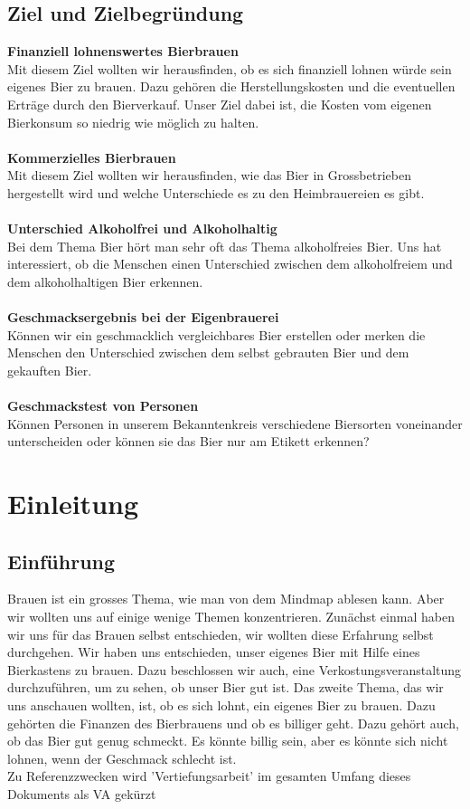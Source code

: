 \subsection{Ziel und Zielbegründung}
\textbf{Finanziell lohnenswertes Bierbrauen}\\
Mit diesem Ziel wollten wir herausfinden, ob es sich finanziell lohnen würde sein eigenes Bier zu brauen. Dazu gehören die Herstellungskosten und die eventuellen Erträge durch den Bierverkauf. Unser Ziel dabei ist, die Kosten vom eigenen Bierkonsum so niedrig wie möglich zu halten.
\\\\\textbf{Kommerzielles Bierbrauen}\\
Mit diesem Ziel wollten wir herausfinden, wie das Bier in Grossbetrieben hergestellt wird und welche Unterschiede es zu den Heimbrauereien es gibt.
\\\\\textbf{Unterschied Alkoholfrei und Alkoholhaltig}\\
Bei dem Thema Bier hört man sehr oft das Thema alkoholfreies Bier. Uns hat interessiert, ob die Menschen einen Unterschied zwischen dem alkoholfreiem und dem alkoholhaltigen Bier erkennen. 
\\\\\textbf{Geschmacksergebnis bei der Eigenbrauerei}\\
Können wir ein geschmacklich vergleichbares Bier erstellen oder merken die Menschen den Unterschied zwischen dem selbst gebrauten Bier und dem gekauften Bier.
\\\\\textbf{Geschmackstest von Personen}\\
Können Personen in unserem Bekanntenkreis verschiedene Biersorten voneinander unterscheiden oder können sie das Bier nur am Etikett erkennen?

\newpage
\section{Einleitung}
\subsection{Einführung}
Brauen ist ein grosses Thema, wie man von dem Mindmap ablesen kann. 
Aber wir wollten uns auf einige wenige Themen konzentrieren.
Zunächst einmal haben wir uns für das Brauen selbst entschieden, 
wir wollten diese Erfahrung selbst durchgehen. Wir haben uns entschieden,
unser eigenes Bier mit Hilfe eines Bierkastens zu brauen. Dazu beschlossen wir auch,
eine Verkostungsveranstaltung durchzuführen, um zu sehen, ob unser Bier gut ist. 
Das zweite Thema, das wir uns anschauen wollten, ist, ob es sich lohnt, ein eigenes Bier zu brauen. Dazu gehörten die Finanzen des Bierbrauens und ob es billiger geht. Dazu gehört auch, ob das Bier gut genug schmeckt. Es könnte billig sein, aber es könnte sich nicht lohnen, wenn der Geschmack schlecht ist.
\\
Zu Referenzzwecken wird 'Vertiefungsarbeit' im gesamten Umfang dieses Dokuments als VA gekürzt
\newpage
